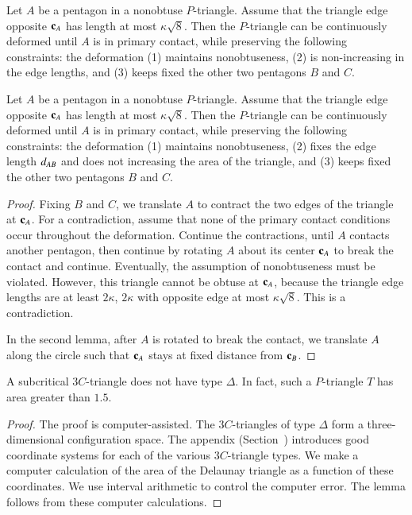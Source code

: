 \begin{lemma} 
  Let $A$ be a pentagon in a nonobtuse $P$-triangle.  Assume that the
  triangle edge opposite ${\mathbf c}_A$ has length at most $\kappa\sqrt{8}$.
  Then the $P$-triangle can be continuously deformed until $A$ is in
  primary contact, while preserving the following constraints: the
  deformation (1) maintains nonobtuseness, (2) is non-increasing in
  the edge lengths, and (3) keeps fixed the other two pentagons $B$
  and $C$.
\end{lemma}

\begin{lemma} 
  Let $A$ be a pentagon in a nonobtuse $P$-triangle.  Assume that the
  triangle edge opposite ${\mathbf c}_A$ has length at most $\kappa\sqrt{8}$.
  Then the $P$-triangle can be continuously deformed until $A$ is in
  primary contact, while preserving the following constraints: the
  deformation (1) maintains nonobtuseness, (2) fixes the
edge length $d_{AB}$ and does not increasing  the area of the triangle, 
and (3) keeps fixed the other two pentagons $B$
  and $C$.
\end{lemma}

\begin{proof} Fixing $B$ and $C$, we translate $A$ to contract the two
  edges of the triangle at ${\mathbf c}_A$.  For a contradiction, assume that
  none of the primary contact conditions occur throughout the
  deformation.  Continue the contractions, until $A$ contacts another
  pentagon, then continue by rotating $A$ about its center ${\mathbf c}_A$ to
  break the contact and continue.  Eventually, the assumption of
  nonobtuseness must be violated.  However, this triangle cannot be
  obtuse at ${\mathbf c}_A$, because the triangle edge lengths are at least $2
  \kappa$, $2 \kappa$ with opposite edge at most
  $\kappa\sqrt{8}$. This is a contradiction.

  In the second lemma, after $A$ is rotated to break the contact, we
  translate $A$ along the circle such that ${\mathbf c}_A$ stays at fixed
  distance from ${\mathbf c}_B$.
\end{proof}

\begin{lemma} 
  A subcritical $3C$-triangle does not have type $\Delta$.  In fact,
  such a $P$-triangle $T$ has area greater than $1.5$.
\end{lemma}

\begin{proof} The proof is computer-assisted.  The $3C$-triangles of
  type $\Delta$ form a three-dimensional configuration space.  The
  appendix (Section~) introduces good coordinate
  systems for each of the various $3C$-triangle types.  We make a
  computer calculation of the area of the Delaunay triangle as a
  function of these coordinates.  We use interval arithmetic to
  control the computer error.  The lemma follows from these computer
  calculations.
\end{proof}



